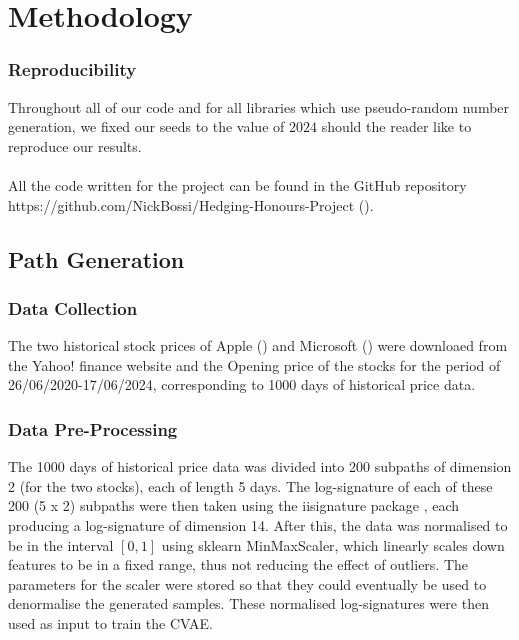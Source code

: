 \documentclass{article}
\theoremstyle{definition}
\begin{document}
\newpage
\section{Methodology}
\subsubsection{Reproducibility}
Throughout all of our code and for all libraries which use pseudo-random number generation, we fixed our seeds to the value of $2024$ should the reader like to reproduce our results.\\\\
All the code written for the project can be found in the GitHub repository https://github.com/NickBossi/Hedging-Honours-Project (\cite{bossi2024hedging}).
\subsection{Path Generation}
\subsubsection{Data Collection}
The two historical stock prices of Apple (\cite{yahoo_finance_apple}) and Microsoft (\cite{yahoo_finance_microsoft}) were downloaed from the Yahoo! finance website and the Opening price of the stocks for the period of 26/06/2020-17/06/2024, corresponding to 1000 days of historical price data.

\subsubsection{Data Pre-Processing}
The 1000 days of historical price data was divided into 200 subpaths of dimension 2 (for the two stocks), each of length 5 days.
The log-signature of each of these 200  (5 x 2) subpaths were then taken using the iisignature package \cite{iisignature}, each producing a log-signature of dimension 14. After this, the data was normalised to be in the interval $[0,1]$ using sklearn MinMaxScaler, which linearly scales down features to be in a fixed range, thus not reducing the effect of outliers. The parameters for the scaler were stored so that they could eventually be used to denormalise the generated samples.
These normalised log-signatures were then used as input to train the CVAE.
\end{document}
